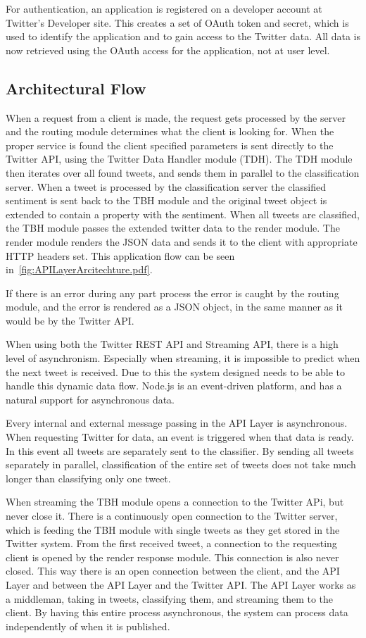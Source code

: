 For authentication, an application is registered on a developer account at Twitter's Developer site. This creates a set of OAuth token and secret, which is used to identify the application and to gain access to the Twitter data. All data is now retrieved using the OAuth access for the application, not at user level. 

\subsection{Architectural Flow}
When a request from a client is made, the request gets processed by the server and the routing module determines what the client is looking for. When the proper service is found the client specified parameters is sent directly to the Twitter API, using the Twitter Data Handler module (TDH). The TDH module then iterates over all found tweets, and sends them in parallel to the classification server. When a tweet is processed by the classification server the classified sentiment is sent back to the TBH module and the original tweet object is extended to contain a property with the sentiment. When all tweets are classified, the TBH module passes the extended twitter data to the render module. The render module renders the JSON data and sends it to the client with appropriate HTTP headers set. This application flow can be seen in~\autoref{fig:APILayerArcitechture.pdf}.

If there is an error during any part process the error is caught by the routing module, and the error is rendered as a JSON object, in the same manner as it would be by the Twitter API. 

When using both the Twitter REST API and Streaming API, there is a high level of asynchronism. Especially when streaming, it is impossible to predict when the next tweet is received. Due to this the system designed needs to be able to handle this dynamic data flow. Node.js is an event-driven platform, and has a natural support for asynchronous data. 

Every internal and external message passing in the API Layer is asynchronous. When requesting Twitter for data, an event is triggered when that data is ready. In this event all tweets are separately sent to the classifier. By sending all tweets separately in parallel, classification of the entire set of tweets does not take much longer than classifying only one tweet. 

When streaming the TBH module opens a connection to the Twitter APi, but never close it. There is a continuously open connection to the Twitter server, which is feeding the TBH module with single tweets as they get stored in the Twitter system. From the first received tweet, a connection to the requesting client is opened by the render response module. This connection is also never closed. This way there is an open connection between the client, and the API Layer and between the API Layer and the Twitter API. The API Layer works as a middleman, taking in tweets, classifying them, and streaming them to the client. By having this entire process asynchronous, the system can process data independently of when it is published.


